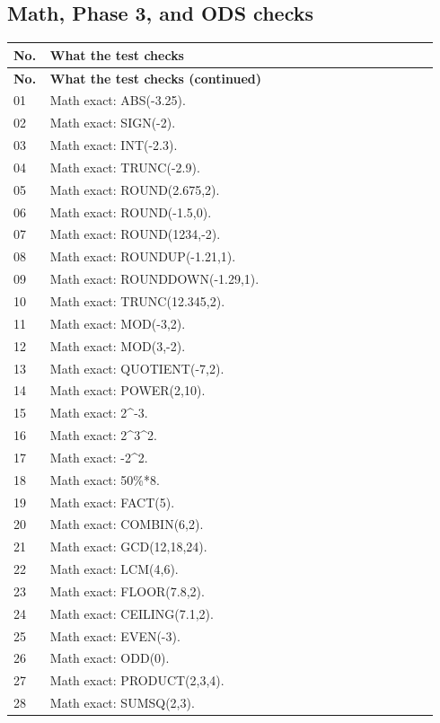 \documentclass[11pt,letterpaper]{article}
\begin{document}
\subsection{Math, Phase 3, and ODS checks}
\begin{longtable}{@{}P{0.07\linewidth}P{0.87\linewidth}@{}}
\toprule\textbf{No.} & \textbf{What the test checks}\\\midrule\endfirsthead
\toprule\textbf{No.} & \textbf{What the test checks (continued)}\\\midrule\endhead
01 & Math exact: ABS(-3.25).\\
02 & Math exact: SIGN(-2).\\
03 & Math exact: INT(-2.3).\\
04 & Math exact: TRUNC(-2.9).\\
05 & Math exact: ROUND(2.675,2).\\
06 & Math exact: ROUND(-1.5,0).\\
07 & Math exact: ROUND(1234,-2).\\
08 & Math exact: ROUNDUP(-1.21,1).\\
09 & Math exact: ROUNDDOWN(-1.29,1).\\
10 & Math exact: TRUNC(12.345,2).\\
11 & Math exact: MOD(-3,2).\\
12 & Math exact: MOD(3,-2).\\
13 & Math exact: QUOTIENT(-7,2).\\
14 & Math exact: POWER(2,10).\\
15 & Math exact: 2\textasciicircum{}-3.\\
16 & Math exact: 2\textasciicircum{}3\textasciicircum{}2.\\
17 & Math exact: -2\textasciicircum{}2.\\
18 & Math exact: 50\%*8.\\
19 & Math exact: FACT(5).\\
20 & Math exact: COMBIN(6,2).\\
21 & Math exact: GCD(12,18,24).\\
22 & Math exact: LCM(4,6).\\
23 & Math exact: FLOOR(7.8,2).\\
24 & Math exact: CEILING(7.1,2).\\
25 & Math exact: EVEN(-3).\\
26 & Math exact: ODD(0).\\
27 & Math exact: PRODUCT(2,3,4).\\
28 & Math exact: SUMSQ(2,3).\\

\end{longtable}
\end{document}
